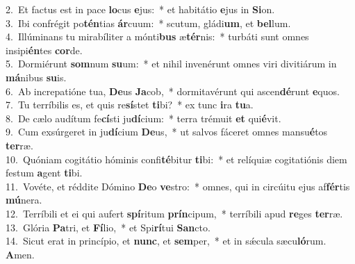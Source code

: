 {2.~}Et factus est in pace \textbf{lo}cus \textbf{e}jus:~* et habitátio \textbf{e}jus in \textbf{Si}on.\\
{3.~}Ibi confrégit po\textbf{tén}tias \textbf{ár}cuum:~* scutum, gládi\textbf{um}, et \textbf{bel}lum.\\
{4.~}Illúminans tu mirabíliter a mónti\textbf{bus} æ\textbf{tér}nis:~* turbáti sunt omnes insipi\textbf{én}tes \textbf{cor}de.\\
{5.~}Dormiérunt \textbf{som}num \textbf{su}um:~* et nihil invenérunt omnes viri divitiárum in \textbf{má}nibus \textbf{su}is.\\
{6.~}Ab increpatióne tua, \textbf{De}us \textbf{Ja}cob,~* dormitavérunt qui ascen\textbf{dé}runt \textbf{e}quos.\\
{7.~}Tu terríbilis es, et quis re\textbf{sí}stet \textbf{ti}bi?~* ex tunc \textbf{i}ra \textbf{tu}a.\\
{8.~}De cælo audítum fe\textbf{cí}sti ju\textbf{dí}cium:~* terra trémuit \textbf{et} qui\textbf{é}vit.\\
{9.~}Cum exsúrgeret in ju\textbf{dí}cium \textbf{De}us,~* ut salvos fáceret omnes mansu\textbf{é}tos \textbf{ter}ræ.\\
{10.~}Quóniam cogitátio hóminis confi\textbf{té}bitur \textbf{ti}bi:~* et relíquiæ cogitatiónis diem festum \textbf{a}gent \textbf{ti}bi.\\
{11.~}Vovéte, et réddite Dómino \textbf{De}o \textbf{ve}stro:~* omnes, qui in circúitu ejus af\textbf{fér}tis \textbf{mú}nera.\\
{12.~}Terríbili et ei qui aufert \textbf{spí}ritum \textbf{prín}cipum,~* terríbili apud \textbf{re}ges \textbf{ter}ræ.\\
{13.~}Glória \textbf{Pa}tri, et \textbf{Fí}lio,~* et Spi\textbf{rí}tui \textbf{San}cto.\\
{14.~}Sicut erat in princípio, et \textbf{nunc}, et \textbf{sem}per,~* et in sǽcula sæcu\textbf{ló}rum. \textbf{A}men.\\
